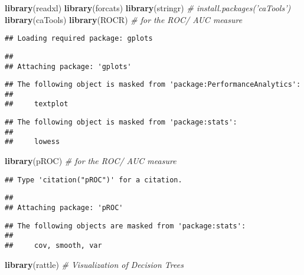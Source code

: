 \documentclass[]{article}
\newenvironment{Shaded}{\begin{snugshade}}{\end{snugshade}}
\newcommand{\KeywordTok}[1]{\textcolor[rgb]{0.13,0.29,0.53}{\textbf{#1}}}
\newcommand{\CommentTok}[1]{\textcolor[rgb]{0.56,0.35,0.01}{\textit{#1}}}
\newcommand{\NormalTok}[1]{#1}
\begin{document}
\begin{Shaded}
\begin{Highlighting}[]
\KeywordTok{library}\NormalTok{(readxl)}
\KeywordTok{library}\NormalTok{(forcats)}
\KeywordTok{library}\NormalTok{(stringr)}
\CommentTok{# install.packages('caTools')}
\KeywordTok{library}\NormalTok{(caTools)}
\KeywordTok{library}\NormalTok{(ROCR) }\CommentTok{# for the ROC/ AUC measure}
\end{Highlighting}
\end{Shaded}

\begin{verbatim}
## Loading required package: gplots
\end{verbatim}

\begin{verbatim}
## 
## Attaching package: 'gplots'
\end{verbatim}

\begin{verbatim}
## The following object is masked from 'package:PerformanceAnalytics':
## 
##     textplot
\end{verbatim}

\begin{verbatim}
## The following object is masked from 'package:stats':
## 
##     lowess
\end{verbatim}

\begin{Shaded}
\begin{Highlighting}[]
\KeywordTok{library}\NormalTok{(pROC) }\CommentTok{# for the ROC/ AUC measure}
\end{Highlighting}
\end{Shaded}

\begin{verbatim}
## Type 'citation("pROC")' for a citation.
\end{verbatim}

\begin{verbatim}
## 
## Attaching package: 'pROC'
\end{verbatim}

\begin{verbatim}
## The following objects are masked from 'package:stats':
## 
##     cov, smooth, var
\end{verbatim}

\begin{Shaded}
\begin{Highlighting}[]
\KeywordTok{library}\NormalTok{(rattle) }\CommentTok{# Visualization of Decision Trees}
\end{Highlighting}
\end{Shaded}
\end{document}
